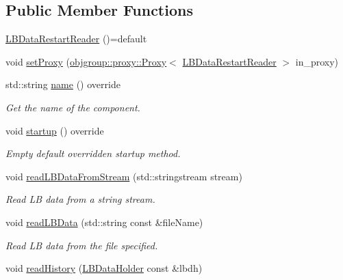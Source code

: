 \subsection*{Public Member Functions}
\begin{DoxyCompactItemize}
\item 
\hyperlink{structvt_1_1vrt_1_1collection_1_1balance_1_1_l_b_data_restart_reader_a66d7aad803c86006eb72e95d46aa945a}{L\+B\+Data\+Restart\+Reader} ()=default
\item 
void \hyperlink{structvt_1_1vrt_1_1collection_1_1balance_1_1_l_b_data_restart_reader_ae30c9f24751a3d57be687c0b1b66c6a2}{set\+Proxy} (\hyperlink{structvt_1_1objgroup_1_1proxy_1_1_proxy}{objgroup\+::proxy\+::\+Proxy}$<$ \hyperlink{structvt_1_1vrt_1_1collection_1_1balance_1_1_l_b_data_restart_reader}{L\+B\+Data\+Restart\+Reader} $>$ in\+\_\+proxy)
\item 
std\+::string \hyperlink{structvt_1_1vrt_1_1collection_1_1balance_1_1_l_b_data_restart_reader_a2d715003c589c23a80346e4f84443fc4}{name} () override
\begin{DoxyCompactList}\small\item\em Get the name of the component. \end{DoxyCompactList}\item 
void \hyperlink{structvt_1_1vrt_1_1collection_1_1balance_1_1_l_b_data_restart_reader_a38c23202434f16113d3c7e474013627a}{startup} () override
\begin{DoxyCompactList}\small\item\em Empty default overridden startup method. \end{DoxyCompactList}\item 
void \hyperlink{structvt_1_1vrt_1_1collection_1_1balance_1_1_l_b_data_restart_reader_ad8f831d516dc5b438db5cbc0f36e47a5}{read\+L\+B\+Data\+From\+Stream} (std\+::stringstream stream)
\begin{DoxyCompactList}\small\item\em Read LB data from a string stream. \end{DoxyCompactList}\item 
void \hyperlink{structvt_1_1vrt_1_1collection_1_1balance_1_1_l_b_data_restart_reader_a663c6182169b2fb68e89fbfc69077700}{read\+L\+B\+Data} (std\+::string const \&file\+Name)
\begin{DoxyCompactList}\small\item\em Read LB data from the file specified. \end{DoxyCompactList}\item 
void \hyperlink{structvt_1_1vrt_1_1collection_1_1balance_1_1_l_b_data_restart_reader_a41149e5cac124b4dfbab58ab3253d840}{read\+History} (\hyperlink{structvt_1_1vrt_1_1collection_1_1balance_1_1_l_b_data_holder}{L\+B\+Data\+Holder} const \&lbdh)

\end{DoxyCompactItemize}
